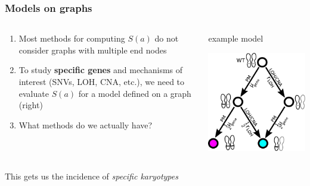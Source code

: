 \documentclass{beamer}
\begin{document}
\begin{frame}
\end{frame}


\begin{frame}
    \frametitle{Models on graphs}
    \begin{columns}
        \begin{column}{0.5\textwidth}
        \begin{enumerate}
            \item Most methods for computing $S(a)$ do not consider graphs with
            multiple end nodes
            \item To study \textbf{specific genes} and mechanisms of interest
            (SNVs, LOH, CNA, etc.), we need to evaluate $S(a)$ for a model
            defined on a graph (right)
            \item What methods do we actually have?
        \end{enumerate}
        \end{column}
        \begin{column}{0.5\textwidth}
        \begin{center}
            \small{example model}
        \end{center}
            \includegraphics[width=\textwidth]{figures/diagram4}
        \end{column}
    \end{columns}

    \;

    \begin{center}
        This gets us the incidence of \emph{specific karyotypes}
    \end{center}
\end{frame}
\end{document}
